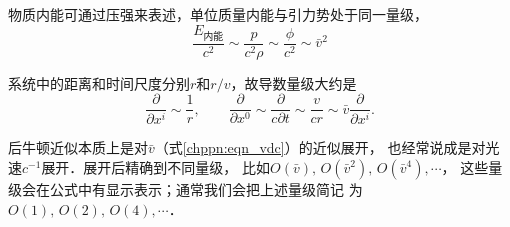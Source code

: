 物质内能可通过压强来表述，单位质量内能与引力势处于同一量级，
\begin{equation}
    \frac{E_{\text{内能}}}{c^2} \sim \frac{p}{c^2 \rho}\sim
    \frac{\phi}{c^2} \sim \bar{v}^2
\end{equation}

系统中的距离和时间尺度分别$r$和$r/v$，故导数量级大约是
\begin{equation}
    \frac{\partial}{\partial x^i}\sim \frac{1}{r},\qquad
    \frac{\partial}{\partial x^0}\sim \frac{\partial}{c \partial t}
    \sim \frac{v}{cr} \sim  \bar{v} \frac{\partial}{\partial x^i}.
\end{equation}


后牛顿近似本质上是对$\bar{v}$（式\eqref{chppn:eqn_vdc}）的近似展开，
也经常说成是对光速$c^{-1}$展开．展开后精确到不同量级，
比如$O(\bar{v}),\, O(\bar{v}^2),\, O(\bar{v}^4),\cdots$，
这些量级会在公式中有显示表示；通常我们会把上述量级简记
为$O(1),\, O(2),\, O(4),\cdots$．


